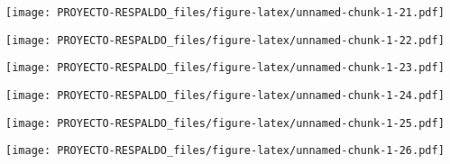 \documentclass[
]{article}
\newenvironment{Shaded}{\begin{snugshade}}{\end{snugshade}}
\newcommand{\CommentTok}[1]{\textcolor[rgb]{0.56,0.35,0.01}{\textit{#1}}}
\newcommand{\DataTypeTok}[1]{\textcolor[rgb]{0.13,0.29,0.53}{#1}}
\newcommand{\KeywordTok}[1]{\textcolor[rgb]{0.13,0.29,0.53}{\textbf{#1}}}
\newcommand{\NormalTok}[1]{#1}
\newcommand{\OperatorTok}[1]{\textcolor[rgb]{0.81,0.36,0.00}{\textbf{#1}}}
\newcommand{\StringTok}[1]{\textcolor[rgb]{0.31,0.60,0.02}{#1}}
\begin{document}
\texttt{[image: PROYECTO-RESPALDO\_files/figure-latex/unnamed-chunk-1-21.pdf]}

\begin{Shaded}
\end{Shaded}

\texttt{[image: PROYECTO-RESPALDO\_files/figure-latex/unnamed-chunk-1-22.pdf]}

\begin{Shaded}
\end{Shaded}

\texttt{[image: PROYECTO-RESPALDO\_files/figure-latex/unnamed-chunk-1-23.pdf]}

\begin{Shaded}
\end{Shaded}

\texttt{[image: PROYECTO-RESPALDO\_files/figure-latex/unnamed-chunk-1-24.pdf]}

\begin{Shaded}
\end{Shaded}

\texttt{[image: PROYECTO-RESPALDO\_files/figure-latex/unnamed-chunk-1-25.pdf]}

\begin{Shaded}
\end{Shaded}

\texttt{[image: PROYECTO-RESPALDO\_files/figure-latex/unnamed-chunk-1-26.pdf]}

\begin{Shaded}
\end{Shaded}
\end{document}
